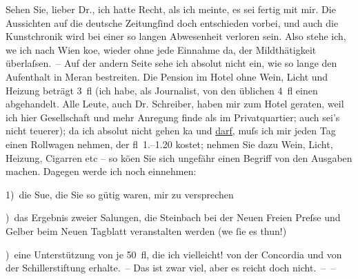 \pstart
           Sehen Sie, lieber Dr., ich hatte Recht, als ich meinte, es sei fertig mit mir. Die
               Aussichten auf die deutsche Zeitungſind doch entschieden vorbei, und auch die Kunstchronik wird bei einer so langen Abwesenheit
               verloren sein. Also stehe ich, we{\geminationn} ich nach Wien ko{\geminationm}e, wieder ohne
               jede Einnahme da, der Mildthätigkeit überlaſsen. – Auf der andern Seite sehe ich
               absolut nicht ein, wie so lange den Aufenthalt in Meran bestreiten. Die Pension im Hotel ohne Wein, Licht und Heizung beträgt
               3 fl (ich habe, als Journalist, von den üblichen 4 fl einen abgehandelt. Alle Leute,
               auch Dr. Schreiber, haben mir zum Hotel
               geraten, weil ich hier Gesellschaft und mehr Anregung finde als im Privatquartier;
               auch sei’s nicht teuerer); da ich absolut nicht gehen ka{\geminationn} und \uline{darf}, muſs ich mir jeden Tag einen Rollwagen
               nehmen, der fl 1.–1.20 kostet; nehmen Sie dazu Wein, Licht, Heizung, Cigarren etc –
               so kö{\geminationn}en Sie sich ungefähr einen Begriff von den
               Ausgaben machen. Dagegen werde ich noch einnehmen:\pend
           
\pstart
           {\pb}1) die Su{\geminationm}e, die
               Sie so gütig waren, mir zu versprechen\pend
           
) das Ergebnis zweier Sa{\geminationm}lungen, die Steinbach bei der Neuen Freien Preſse und Gelber beim Neuen Tagblatt veranstalten
               werden (we{\geminationn}{ }ſie es thun!)\pend
           
) eine Unterstützung von je 50 fl, die ich vielleicht! von der Concordia und von der Schillerstiftung erhalte. – Das ist zwar viel, aber es reicht doch
               nicht. – –\pend
           
